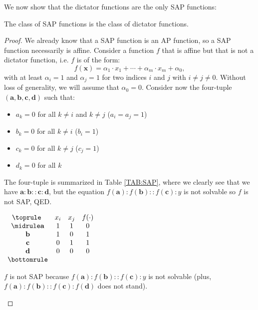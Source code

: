 We now show that the dictator functions are the only SAP functions:

\begin{proposition}
  The class of SAP functions is the class of dictator functions.
\end{proposition}
\begin{proof}
  We already know that a SAP function is an AP function, so a SAP function
  necessarily is affine. Consider a function $f$ that is affine but that is not
  a dictator function, i.e. $f$ is of the form:
  $$f(\mathbf{x}) = \alpha_1 \cdot x_1 + \cdots +\alpha_m \cdot x_m + \alpha_0,$$
  with at least $\alpha_i = 1$ and $\alpha_j = 1$ for two indices $i$ and $j$
  with $i\neq j \neq 0$. Without loss of generality, we will assume that
  $\alpha_0 = 0$.
  Consider now the four-tuple $(\mathbf{a}, \mathbf{b}, \mathbf{c},
  \mathbf{d})$ such that:
  \begin{itemize}
    \item $a_k = 0$ for all $k \neq i$ and $k\neq j$ ($a_i = a_j = 1$)
    \item $b_k = 0$ for all $k \neq i$ ($b_i = 1$)
    \item $c_k = 0$ for all $k \neq j$ ($c_j = 1$)
    \item $d_k = 0$ for all $k$
  \end{itemize}

  The four-tuple is summarized in Table \ref{TAB:SAP}, where we clearly see
  that we have $\mathbf{a} : \mathbf{b} :: \mathbf{c} : \mathbf{d}$, but the
  equation $f(\mathbf{a}) : f(\mathbf{b}) :: f(\mathbf{c}) : y$ is not solvable
  so $f$ is not SAP, QED.

\begin{table}[ht]
  \center
$\begin{array}{cccc}
  \toprule
  ~ & x_i & x_j & f(\cdot) \\
  \midrule
  \mathbf{a} & 1 & 1 & 0\\
  \mathbf{b} & 1 & 0 & 1\\
  \mathbf{c} & 0 & 1 & 1\\
  \mathbf{d} & 0 & 0 & 0\\
  \bottomrule
\end{array}
$\bigskip
\caption{$f$ is not SAP because $f(\mathbf{a}) : f(\mathbf{b}) :: f(\mathbf{c})
  : y$ is not solvable (plus, $f(\mathbf{a}) : f(\mathbf{b}) :: f(\mathbf{c}) :
  f(\mathbf{d})$ does not stand).}
\label{TAB:SAP}
\end{table}

\end{proof}

